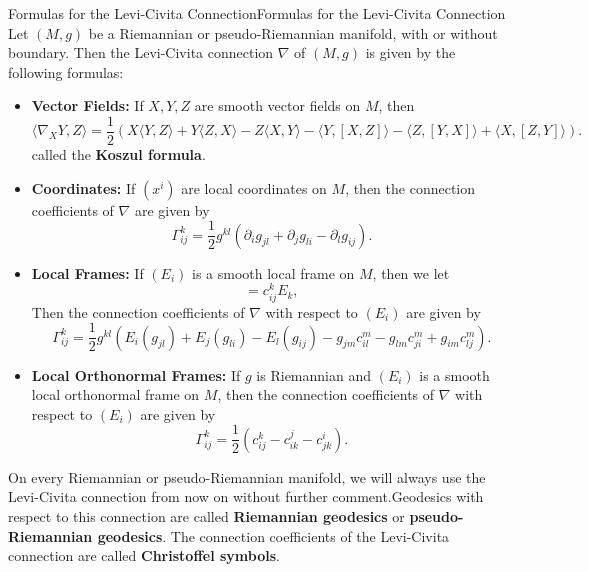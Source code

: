 \documentclass[../main.tex]{subfiles}
\begin{document}
\begin{theorem}{Formulas for the Levi-Civita Connection}{Formulas for the Levi-Civita Connection}
	Let $(M, g)$ be a Riemannian or pseudo-Riemannian manifold, with or without boundary. Then the Levi-Civita connection $\nabla$ of $(M, g)$ is given by the following formulas:
	\begin{itemize}
		\item \textbf{Vector Fields: } If $X, Y, Z$ are smooth vector fields on $M$, then
		      \begin{equation}
			      \langle \nabla_X Y, Z \rangle = \frac{1}{2} \left( X\langle Y, Z \rangle + Y\langle Z, X \rangle - Z\langle X, Y \rangle - \langle Y, [X, Z] \rangle - \langle Z, [Y, X] \rangle + \langle X, [Z, Y] \rangle \right).
		      \end{equation}
		      called the \textbf{Koszul formula}.
		\item \textbf{Coordinates: } If $(x^i)$ are local coordinates on $M$, then the connection coefficients of $\nabla$ are given by
		      \begin{equation}
			      \Gamma_{ij}^k = \frac{1}{2} g^{kl} \left( \partial_i g_{jl} + \partial_j g_{li} - \partial_l g_{ij} \right).
		      \end{equation}
		\item \textbf{Local Frames: } If $(E_i)$ is a smooth local frame on $M$, then we let
		      \begin{equation}
			      [E_i, E_j] = c_{ij}^k E_k,
		      \end{equation}
		      Then the connection coefficients of $\nabla$ with respect to $(E_i)$ are given by
		      \begin{equation}
			      \Gamma_{ij}^k = \frac{1}{2} g^{kl} \left( E_i(g_{jl}) + E_j(g_{li}) - E_l(g_{ij}) - g_{jm} c_{il}^m - g_{lm} c_{ji}^m + g_{im} c_{lj}^m \right).
		      \end{equation}
		\item \textbf{Local Orthonormal Frames: } If $g$ is Riemannian and $(E_i)$ is a smooth local orthonormal frame on $M$, then the connection coefficients of $\nabla$ with respect to $(E_i)$ are given by
		      \begin{equation}
			      \Gamma_{ij}^k = \frac{1}{2} \left( c_{ij}^k - c_{ik}^j - c_{jk}^i \right).
		      \end{equation}
	\end{itemize}
\end{theorem}

On every Riemannian or pseudo-Riemannian manifold, we will always use the Levi-Civita connection from now on without further comment.Geodesics with respect to this connection are called \textbf{Riemannian geodesics} or \textbf{pseudo-Riemannian geodesics}. The connection coefficients of the Levi-Civita connection are called \textbf{Christoffel symbols}.
\end{document}
